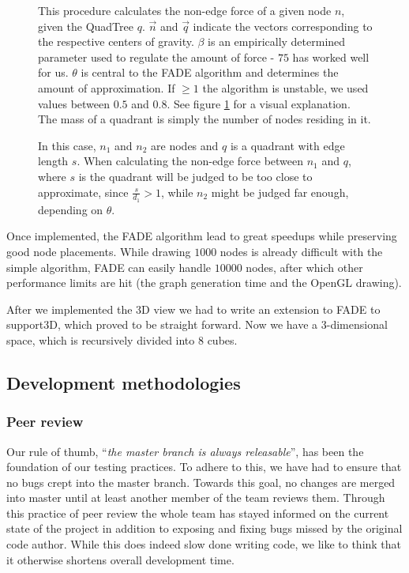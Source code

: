 \documentclass[a4paper,11pt,titlepage]{article}
\begin{document}
\begin{figure}[ht]
  \begin{minipage}[b]{0.5\linewidth}
    
    \caption{This procedure calculates the non-edge force of a given
      node \(n\), given the QuadTree \(q\). \(\vec{n}\) and
      \(\vec{q}\) indicate the vectors corresponding to the respective
      centers of gravity. \(\beta\) is an empirically determined
      parameter used to regulate the amount of force - \(75\) has
      worked well for us. \(\theta\) is central to the FADE algorithm
      and determines the amount of approximation. If \(\geq 1\) the
      algorithm is unstable, we used values between \(0.5\) and
      \(0.8\). See figure \ref{fig:theta} for a visual
      explanation. The mass of a quadrant is simply the number of
      nodes residing in it. }
    \label{proc:FADE}
  \end{minipage}
  \hspace{10pt}
  \begin{minipage}[b]{0.5\linewidth}
    \centering
    
    \caption{In this case, \(n_1\) and \(n_2\) are nodes and \(q\) is
      a quadrant with edge length \(s\). When calculating the non-edge
      force between \(n_1\) and \(q\), where \(s\) is the quadrant
      will be judged to be too close to approximate, since
      \(\frac{s}{d_1} > 1\), while \(n_2\) might be judged far enough,
      depending on \(\theta\).}
    \label{fig:theta}
  \end{minipage}
\end{figure}

Once implemented, the FADE algorithm lead to great speedups while
preserving good node placements. While drawing \(1000\) nodes is
already difficult with the simple algorithm, FADE can easily handle
\(10000\) nodes, after which other performance limits are hit (the
graph generation time and the OpenGL drawing).

After we implemented the 3D view we had to write an extension to FADE to support3D, which proved to be straight forward. Now we have a 3-dimensional space,
which is recursively divided into $8$ cubes.


\subsection{Development methodologies}

\subsubsection{Peer review}
Our rule of thumb, ``\emph{the master branch is always releasable}'',
has been
the foundation of our testing practices. To adhere to this, we have
had to ensure that no bugs crept into the master branch. Towards this
goal, no changes are merged into master until at least another member
of the team reviews them. Through this practice of peer review the
whole team has stayed informed on the current state of the project
in addition to exposing and fixing bugs missed by the original code
author. While this does indeed slow done writing code, we like to
think that it otherwise shortens overall development time.
\end{document}
